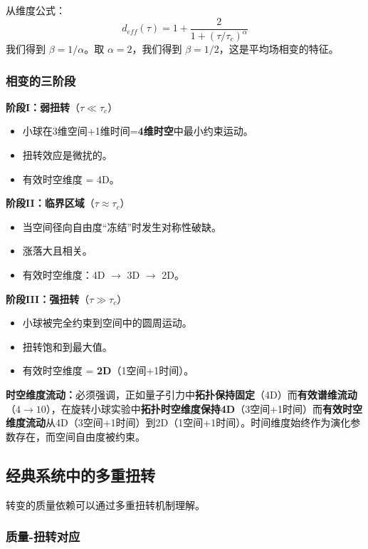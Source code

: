 \documentclass[12pt,a4paper]{article}
\begin{document}
从维度公式：
\begin{equation}
    d_{eff}(\tau) = 1 + \frac{2}{1+(\tau/\tau_c)^\alpha}
\end{equation}
我们得到 $\beta = 1/\alpha$。取 $\alpha = 2$，我们得到 $\beta = 1/2$，这是平均场相变的特征。

\subsubsection{相变的三阶段}

\textbf{阶段I：弱扭转}（$\tau \ll \tau_c$）
\begin{itemize}
    \item 小球在3维空间+1维时间=\textbf{4维时空}中最小约束运动。
    \item 扭转效应是微扰的。
    \item 有效时空维度 = 4D。
\end{itemize}

\textbf{阶段II：临界区域}（$\tau \approx \tau_c$）
\begin{itemize}
    \item 当空间径向自由度``冻结''时发生对称性破缺。
    \item 涨落大且相关。
    \item 有效时空维度：4D $\to$ 3D $\to$ 2D。
\end{itemize}

\textbf{阶段III：强扭转}（$\tau \gg \tau_c$）
\begin{itemize}
    \item 小球被完全约束到空间中的圆周运动。
    \item 扭转饱和到最大值。
    \item 有效时空维度 = \textbf{2D}（1空间+1时间）。
\end{itemize}

\textbf{时空维度流动：}必须强调，正如量子引力中\textbf{拓扑保持固定}（4D）而\textbf{有效谱维流动}（$4 \to 10$），在旋转小球实验中\textbf{拓扑时空维度保持4D}（3空间+1时间）而\textbf{有效时空维度流动}从4D（3空间+1时间）到2D（1空间+1时间）。时间维度始终作为演化参数存在，而空间自由度被约束。

\subsection{经典系统中的多重扭转}

转变的质量依赖可以通过多重扭转机制理解。

\subsubsection{质量-扭转对应}
\end{document}
